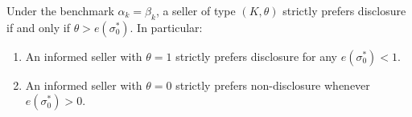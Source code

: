 \label{prop:premium}
Under the benchmark $\alpha_k=\beta_k$, a seller of type $(K,\theta)$ strictly prefers disclosure if and only if $\theta > e(\sigma_0^*)$. In particular:
\begin{enumerate}[label=(\roman*)]
    \item An informed seller with $\theta=1$ strictly prefers disclosure for any $e(\sigma_0^*)<1$.
    \item An informed seller with $\theta=0$ strictly prefers non-disclosure whenever $e(\sigma_0^*)>0$.
\end{enumerate}
